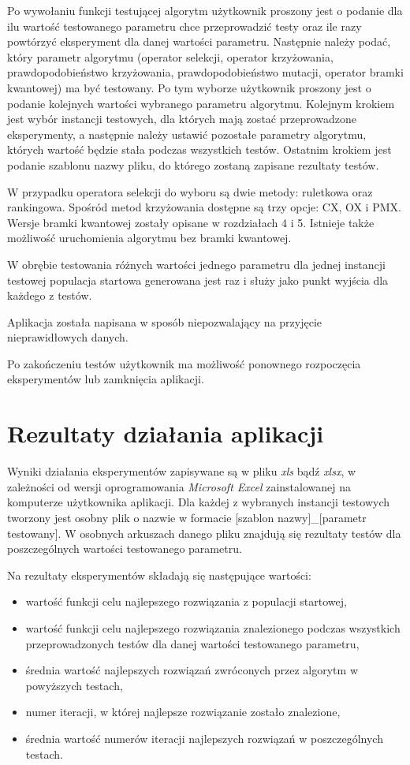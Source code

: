 Po wywołaniu funkcji testującej algorytm użytkownik proszony jest o podanie dla ilu wartość testowanego parametru chce przeprowadzić testy oraz ile razy powtórzyć eksperyment dla danej wartości parametru. Następnie należy podać, który parametr algorytmu (operator selekcji, operator krzyżowania, prawdopodobieństwo krzyżowania, prawdopodobieństwo mutacji, operator bramki kwantowej) ma być testowany. Po tym wyborze użytkownik proszony jest o podanie kolejnych wartości wybranego parametru algorytmu. Kolejnym krokiem jest wybór instancji testowych, dla których mają zostać przeprowadzone eksperymenty, a następnie należy ustawić pozostałe parametry algorytmu, których wartość będzie stała podczas wszystkich testów. Ostatnim krokiem jest podanie szablonu nazwy pliku, do którego zostaną zapisane rezultaty testów. 

W przypadku operatora selekcji do wyboru są dwie metody: ruletkowa oraz rankingowa. Spośród metod krzyżowania dostępne są trzy opcje: CX, OX i PMX. Wersje bramki kwantowej zostały opisane w rozdziałach 4 i 5. Istnieje także możliwość uruchomienia algorytmu bez bramki kwantowej.

W obrębie testowania różnych wartości jednego parametru dla jednej instancji testowej populacja startowa generowana jest raz i służy jako punkt wyjścia dla każdego z testów.

Aplikacja została napisana w sposób niepozwalający na przyjęcie nieprawidłowych danych.

Po zakończeniu testów użytkownik ma możliwość ponownego rozpoczęcia eksperymentów lub zamknięcia aplikacji.

\section{Rezultaty działania aplikacji}
Wyniki działania eksperymentów zapisywane są w pliku \textit{xls} bądź \textit{xlsx}, w zależności od wersji oprogramowania \textit{Microsoft Excel} zainstalowanej na komputerze użytkownika aplikacji. Dla każdej z wybranych instancji testowych tworzony jest osobny plik o nazwie w formacie [szablon nazwy]\_[parametr testowany]. W osobnych arkuszach danego pliku znajdują się rezultaty testów dla poszczególnych wartości testowanego parametru.

Na rezultaty eksperymentów składają się następujące wartości:
\begin{itemize}
\item wartość funkcji celu najlepszego rozwiązania z populacji startowej,
\item wartość funkcji celu najlepszego rozwiązania znalezionego podczas wszystkich przeprowadzonych testów dla danej wartości testowanego parametru,
\item średnia wartość najlepszych rozwiązań zwróconych przez algorytm w powyższych testach,
\item numer iteracji, w której najlepsze rozwiązanie zostało znalezione,
\item średnia wartość numerów iteracji najlepszych rozwiązań w poszczególnych testach.  
\end{itemize}

